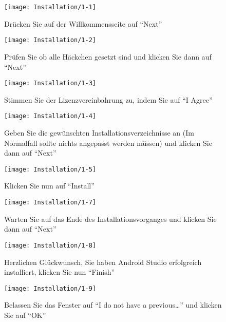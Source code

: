 \begin{figure}
  \centering
  \begin{minipage}[b]{0.48\textwidth}
    \texttt{[image: Installation/1-1]}
    \caption{Drücken Sie auf der Willkommensseite auf ``Next''}
  \end{minipage}
  \hfill
  \begin{minipage}[b]{0.48\textwidth}
    \texttt{[image: Installation/1-2]}
    \caption{Prüfen Sie ob alle Häckchen gesetzt sind und klicken Sie dann auf ``Next''}
  \end{minipage}
\end{figure}

\begin{figure}
  \centering
  \begin{minipage}[b]{0.48\textwidth}
    \texttt{[image: Installation/1-3]}
    \caption{Stimmen Sie der Lizenzvereinbahrung zu, indem Sie auf ``I Agree''}
  \end{minipage}
  \hfill
  \begin{minipage}[b]{0.48\textwidth}
    \texttt{[image: Installation/1-4]}
    \caption{Geben Sie die gewünschten Installationsverzeichnisse an (Im Normalfall sollte nichts angepasst werden müssen) und klicken Sie dann auf ``Next''}
  \end{minipage}
\end{figure}

\begin{figure}
  \centering
  \begin{minipage}[b]{0.48\textwidth}
    \texttt{[image: Installation/1-5]}
    \caption{Klicken Sie nun auf ``Install''}
  \end{minipage}
  \hfill
  \begin{minipage}[b]{0.48\textwidth}
    \texttt{[image: Installation/1-7]}
    \caption{Warten Sie auf das Ende des Installationsvorganges und klicken Sie dann auf ``Next''}
  \end{minipage}
\end{figure}

\begin{figure}
  \centering
  \begin{minipage}[b]{0.48\textwidth}
    \texttt{[image: Installation/1-8]}
    \caption{Herzlichen Glückwunsch, Sie haben Android Studio erfolgreich installiert, klicken Sie nun ``Finish''}
  \end{minipage}
  \hfill
  \begin{minipage}[b]{0.48\textwidth}
    \texttt{[image: Installation/1-9]}
    \caption{Belassen Sie das Fenster auf ``I do not have a previous\ldots'' und klicken Sie auf ``OK''}
  \end{minipage}
\end{figure}

